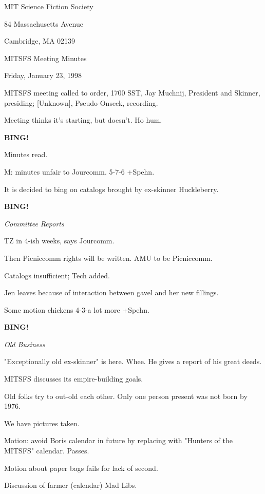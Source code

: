 \documentclass[12pt]{article}
\newcommand{\bing}{{\bf BING!} }
\newcommand{\goto}[1]{\bing \vskip 12pt \centerline{{\em{#1}}}}
\begin{document}
\begin{center}

MIT Science Fiction Society 

84 Massachusetts Avenue

Cambridge, MA 02139

\vspace{12pt}

MITSFS Meeting Minutes 

Friday, January 23, 1998

\end{center}
 
\vspace{18pt}

\setlength{\parskip}{6pt}

\noindent
MITSFS meeting called to order, 1700 SST,
Jay Muchnij, President and Skinner, presiding; [Unknown], Pseudo-Onseck, recording.

Meeting thinks it's starting, but doesn't. Ho hum.

\bing

Minutes read.

M: minutes unfair to Jourcomm. 5-7-6 +Spehn.

It is decided to bing on catalogs brought by ex-skinner Huckleberry.

\goto{Committee Reports}

TZ in 4-ish weeks, says Jourcomm.

Then Picniccomm rights will be written. AMU to be Picniccomm.

Catalogs insufficient; Tech added.

Jen leaves because of interaction between gavel and her new fillings.

Some motion chickens 4-3-a lot more +Spehn.

\goto{Old Business}

"Exceptionally old ex-skinner" is here. Whee. He gives a report of his great deeds.

MITSFS discusses its empire-building goals.

Old folks try to out-old each other. Only one person present was not born by 1976.

We have pictures taken.

Motion: avoid Boris calendar in future by replacing with "Hunters of the MITSFS" calendar. Passes.

Motion about paper bags fails for lack of second.

Discussion of farmer (calendar) Mad Libs.
\end{document}
